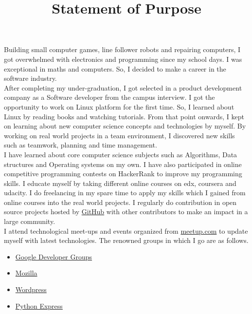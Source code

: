 \documentclass{article}
\title{Statement of Purpose}
\author{}
\begin{document}
  \maketitle %

Building small computer games, line follower robots and repairing computers, I got overwhelmed with electronics and programming since my school days. I was exceptional in maths and computers. So, I decided to make a career in the software industry.\\

After completing my under-graduation, I got selected in a product development company as a Software developer from the campus interview. I got the opportunity to work on Linux platform for the first time. So, I learned about Linux by reading books and watching tutorials. From that point onwards, I kept on learning about new computer science concepts and technologies by myself. By working on real world projects in a team environment, I discovered new skills such as teamwork, planning and time management.\\

I have learned about core computer science subjects such as Algorithms, Data structures and Operating systems on my own. I have  also participated in online competitive programming contests on HackerRank to improve my programming skills. I educate myself by taking different online courses on edx, coursera and udacity. I do freelancing in my spare time to apply my skills which I gained from online courses into the real world projects. I regularly do contribution in open source projects hosted by \href{http://www.GitHub.com/mehul-m-prajapati}{GitHub} with other contributors to make an impact in a large community.\\

I attend technological meet-ups and events organized from \href{www.meetup.com}{meetup.com} to update myself with latest technologies. The renowned groups in which I go are as follows.

\begin{itemize}
   \item \href{https://developers.google.com/groups/chapter/106261089114347152720/}{Google Developer Groups}
   
   \item \href{http://mozillaindia.org/}{Mozilla} 
   
   \item \href{https://www.meetup.com/ahmedabad-wp-meetup/members/72560962/}{Wordpress}
   
   \item \href{https://pythonexpress.in/}{Python Express}
\end{itemize}
\end{document}
